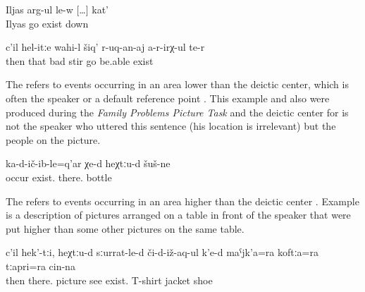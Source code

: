 \begin{exe}
	\ex	\label{ex:Ilja is going downwards periphrastic}
	\gll	Iljas	arg-ul	le-w	[\ldots]	kat'\\
		Ilyas	go	exist	{}	down\\
	\glt	{}
	
	\ex	\label{ex:Then, badly like this, she is not able to move}
	\gll	c'il	hel-itːe	wahi-l	šiq'	r-uq-an-aj	a-r-irχ-ul	te-r\\
		then	that\tsc{-advz}	bad	stir	go be.able exist\\
	\glt	{}

\end{exe}

The   refers to events occurring in an area lower than the deictic center, which is often the speaker or a default reference point . This example and also  were produced during the \textit{Family Problems Picture Task} \citep{SanRoqueEtAl2012} and the deictic center for  is not the speaker who uttered this sentence (his location is irrelevant) but the people on the picture. 

\begin{exe}
	\ex	\label{ex:There bottles have fallen down periphrastic}
	\gll	ka-d-ič-ib-le=q'ar	χe-d	heχtːu-d	šuš-ne\\
		occur	exist.	there.	bottle\\
	\glt	{}
\end{exe}

The   refers to events occurring in an area higher than the deictic center . Example  is a description of pictures arranged on a table in front of the speaker that were put higher than some other pictures on the same table.  

\begin{exe}
	\ex	\label{ex:Then there one the picture it shows there are his T-shirt, jacket, and shoes.}
	\gll	c'il	hek'-tːi,	heχtːu-d	sːurrat-le-d	či-d-iž-aq-ul	k'e-d	maˁjk'a=ra	koftːa=ra		tːapri=ra	cin-na\\
		then		there.	picture	see	exist.	T-shirt\tsc{=add}	jacket		shoe	\\
	\glt	{}
\end{exe}

